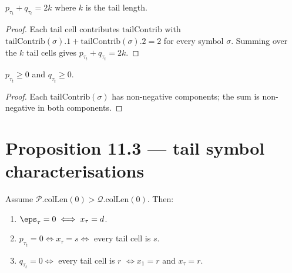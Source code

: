 \begin{lemma}
  \label{lem:tailSig_sum}
  \leanok
  $p_{\tau_t} + q_{\tau_t} = 2k$ where $k$ is the tail length.
\end{lemma}
\begin{proof}
  \leanok
  Each tail cell contributes $\mathrm{tailContrib}$ with $\mathrm{tailContrib}(\sigma).1 + \mathrm{tailContrib}(\sigma).2 = 2$ for every symbol $\sigma$. Summing over the $k$ tail cells gives $p_{\tau_t} + q_{\tau_t} = 2k$.
\end{proof}


\begin{lemma}
  \label{lem:tailSig_nonneg}
  \leanok
  $p_{\tau_t} \geq 0$ and $q_{\tau_t} \geq 0$.
\end{lemma}
\begin{proof}
  \leanok
  Each $\mathrm{tailContrib}(\sigma)$ has non-negative components; the sum is non-negative in both components.
\end{proof}


\section{Proposition 11.3 — tail symbol characterisations}

\begin{lemma}
  \label{lem:11_3}
  \leanok
  Assume $\mathcal{P}.\mathrm{colLen}(0) > \mathcal{Q}.\mathrm{colLen}(0)$. Then:
  \begin{enumerate}
    \item $\eps_\tau = 0 \iff x_\tau = d$.
    \item $p_{\tau_t} = 0 \iff x_\tau = s \iff $ every tail cell is $s$.
    \item $q_{\tau_t} = 0 \iff $ every tail cell is $r$ $\iff x_1 = r$ and $x_\tau = r$.
  \end{enumerate}
\end{lemma}

